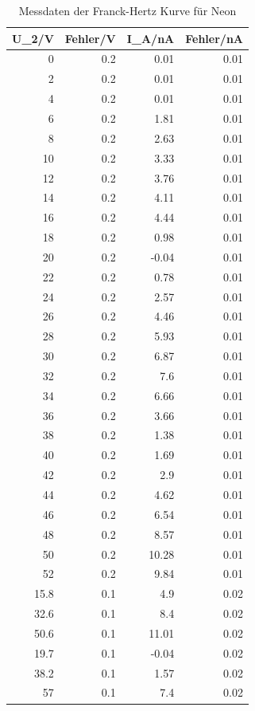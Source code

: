 \documentclass[12pt,a4paper]{article}
\begin{document}
\begin{table}[H]
\caption{Messdaten der Franck-Hertz Kurve für Neon}
\begin{center}
\begin{tabular}{|r|r|r|r|}
\hline
\multicolumn{1}{|l|}{U\_2/V} & \multicolumn{1}{l|}{Fehler/V} & \multicolumn{1}{l|}{I\_A/nA} & \multicolumn{1}{l|}{Fehler/nA} \\ \hline
0 & 0.2 & 0.01 & 0.01 \\ \hline
2 & 0.2 & 0.01 & 0.01 \\ \hline
4 & 0.2 & 0.01 & 0.01 \\ \hline
6 & 0.2 & 1.81 & 0.01 \\ \hline
8 & 0.2 & 2.63 & 0.01 \\ \hline
10 & 0.2 & 3.33 & 0.01 \\ \hline
12 & 0.2 & 3.76 & 0.01 \\ \hline
14 & 0.2 & 4.11 & 0.01 \\ \hline
16 & 0.2 & 4.44 & 0.01 \\ \hline
18 & 0.2 & 0.98 & 0.01 \\ \hline
20 & 0.2 & -0.04 & 0.01 \\ \hline
22 & 0.2 & 0.78 & 0.01 \\ \hline
24 & 0.2 & 2.57 & 0.01 \\ \hline
26 & 0.2 & 4.46 & 0.01 \\ \hline
28 & 0.2 & 5.93 & 0.01 \\ \hline
30 & 0.2 & 6.87 & 0.01 \\ \hline
32 & 0.2 & 7.6 & 0.01 \\ \hline
34 & 0.2 & 6.66 & 0.01 \\ \hline
36 & 0.2 & 3.66 & 0.01 \\ \hline
38 & 0.2 & 1.38 & 0.01 \\ \hline
40 & 0.2 & 1.69 & 0.01 \\ \hline
42 & 0.2 & 2.9 & 0.01 \\ \hline
44 & 0.2 & 4.62 & 0.01 \\ \hline
46 & 0.2 & 6.54 & 0.01 \\ \hline
48 & 0.2 & 8.57 & 0.01 \\ \hline
50 & 0.2 & 10.28 & 0.01 \\ \hline
52 & 0.2 & 9.84 & 0.01 \\ \hline
15.8 & 0.1 & 4.9 & 0.02 \\ \hline
32.6 & 0.1 & 8.4 & 0.02 \\ \hline
50.6 & 0.1 & 11.01 & 0.02 \\ \hline
19.7 & 0.1 & -0.04 & 0.02 \\ \hline
38.2 & 0.1 & 1.57 & 0.02 \\ \hline
57 & 0.1 & 7.4 & 0.02 \\ \hline
\end{tabular}
\end{center}
\label{tab: daten_n}
\end{table}
\end{document}
